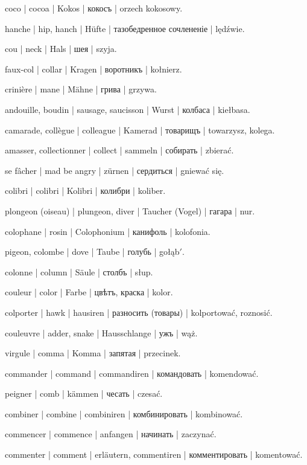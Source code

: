 \begin{outdent}{1em}
coco | cocoa | Kokos | кокосъ | orzech kokosowy.

hanche | hip, hanch | Hüfte | тазобедренное сочлененіе | lędźwie.

cou | neck | Hals | шея | szyja.

\uvsubentry{}
faux-col | collar | Kragen | воротникъ | kołnierz.


\uvsubentry{}
crinière | mane | Mähne | грива | grzywa.

andouille, boudin | sausage, saucisson | Wurst | колбаса | kiełbasa.

camarade, collègue | colleague | Kamerad | товарищъ | towarzysz, kolega.

amasser, collectionner | collect | sammeln | собирать | zbierać.

se fâcher | mad be angry | zürnen | сердиться | gniewać się.

colibri | colibri | Kolibri | колибри | koliber.

plongeon (oiseau) | plungeon, diver | Taucher (Vogel) | гагара | nur.

colophane | rosin | Colophonium | канифоль | kolofonia.

pigeon, colombe | dove | Taube | голубь | gołąb$'$.

colonne | column | Säule | столбъ | słup.

couleur | color | Farbe | цвѣтъ, краска | kolor.

colporter | hawk | hausiren | разносить (товары) | kolportować, roznosić.

couleuvre | adder, snake | Hausschlange | ужъ | wąż.

virgule | comma | Komma | запятая | przecinek.

commander | command | commandiren | командовать | komendować.

peigner | comb | kämmen | чесать | czesać.

combiner | combine | combiniren | комбинировать | kombinować.

commencer | commence | anfangen | начинать | zaczynać.

commenter | comment | erläutern, commentiren | комментировать | komentować.


\end{outdent}
